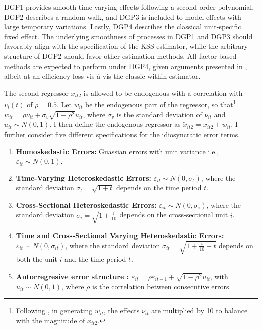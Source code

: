 \ac{DGP}1 provides smooth time-varying effects following a second-order polynomial, \ac{DGP}2 describes a random walk, and \ac{DGP}3 is included to model effects with large temporary variations. Lastly, \ac{DGP}4 describes the classical unit-specific fixed effect. The underlying smoothness of processes in \ac{DGP}1 and \ac{DGP}3 should favorably align with the specification of the \ac{KSS} estimator, while the arbitrary structure of \ac{DGP}2 should favor other estimation methods. All factor-based methods are expected to perform under \ac{DGP}4, given arguments presented in , albeit at an efficiency loss vis-á-vis the classic within estimator. 

The second regressor $x_{it2}$ is allowed to be endogenous with a correlation with $v_i(t)$ of $\rho = 0.5$. Let $w_{it}$ be the endogenous part of the regressor, so that\footnote{Following \citet{kneip2012new}, in generating $w_{i t}$, the effects $\nu_{it}$ are multiplied by 10 to balance with the magnitude of $x_{i t2}$.} $w_{it} = \rho \nu_{it} + \sigma_v \sqrt{1-\rho^2}u_{it}$, where $\sigma_v$ is the standard deviation of $\nu_{it}$ and $u_{i t} \sim N(0,1)$. I then define the endogenous regressor as $\tilde{x}_{it2} = x_{it2} + w_{it}$. I further consider five different specifications for the idiosyncratic error terms. 

\begin{enumerate}
    \item \textbf{Homoskedastic Errors:} Guassian errors with unit variance i.e.,$\varepsilon_{it} \sim N(0,1)$.
    \item \textbf{Time-Varying Heteroskedastic Errors:} $\varepsilon_{it} \sim N(0,\sigma_t)$, where the standard deviation $\sigma_t = \sqrt{1+t}$ depends on the time period $t$.
    \item \textbf{Cross-Sectional Heteroskedastic Errors:}  $\varepsilon_{it} \sim N(0,\sigma_i)$, where the standard deviation $\sigma_i = \sqrt{1+\frac{i}{10}}$ depends on the cross-sectional unit $i$.
    \item \textbf{Time and Cross-Sectional Varying Heteroskedastic Errors:} $\varepsilon_{it} \sim N(0, \sigma_{it})$, where the standard deviation $\sigma_{it} = \sqrt{1 + \frac{i}{10} +t}$ depends on both the unit $i$ and the time period $t$.
    \item \textbf{Autorregresive error structure :} $\varepsilon_{it} = \rho \varepsilon_{it-1} + \sqrt{1 - \rho^2} u_{it}$, with $u_{it} \sim N(0,1)$, where $\rho$ is the correlation between consecutive errors. 
\end{enumerate}


